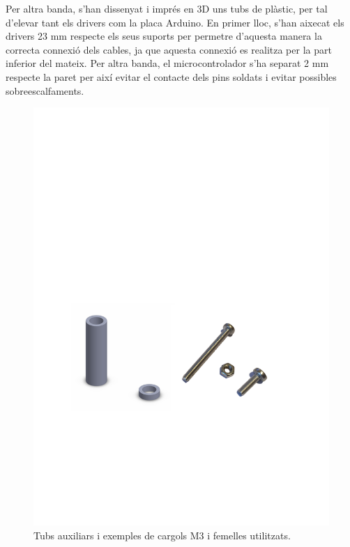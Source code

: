 Per altra banda, s'han dissenyat i imprés en 3D uns tubs de plàstic, per tal d’elevar tant els drivers com la placa Arduino. En primer lloc, s’han aixecat els drivers 23 mm respecte els seus suports per permetre d’aquesta manera la correcta connexió dels cables, ja que aquesta connexió es realitza per la part inferior del mateix. Per altra banda, el microcontrolador s’ha separat 2 mm respecte la paret per així evitar el contacte dels pins soldats i evitar possibles sobreescalfaments. 

\begin{figure}[H]
	\centering
	\includegraphics{tubs}
	\caption{Tubs auxiliars i exemples de cargols M3 i femelles utilitzats.}
	\label{fig:tubs}
\end{figure}




  

